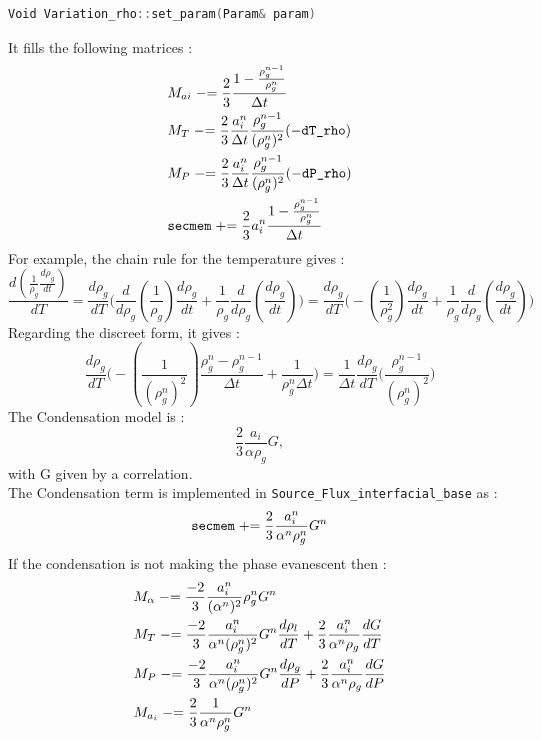 \begin{lstlisting}[language=c++]
Void Variation_rho::set_param(Param& param)
\end{lstlisting}
It fills the following matrices :
\begin{align}
    &M_{ai} \mathrel{-}=  \frac{2}{3}\frac{1-\frac{\rho_g^{n-1}}{\rho_g^n}}{\Delta t}\\
    &M_{T} \mathrel{-}=  \frac{2}{3} \frac{a^n_i}{\Delta t} \frac{\rho_g^{n-1}}{(\rho_g^{n})^2}(-\texttt{dT\_rho})\\
    &M_{P} \mathrel{-}=  \frac{2}{3}\frac{a^n_i}{\Delta t} \frac{\rho_g^{n-1}}{(\rho_g^{n})^2}(-\texttt{dP\_rho})\\
    &\texttt{secmem} \mathrel{+}=  \frac{2}{3}a^n_i\frac{1-\frac{\rho_g^{n-1}}{\rho_g^n}}{\Delta t}
\end{align}
For example, the chain rule for the temperature gives :
\begin{equation}
    \frac{d(\frac{1}{\rho_g}\frac{d\rho_g}{dt})}{dT}=\frac{d\rho_g}{dT}\Bigg(\frac{d}{d\rho_g}(\frac{1}{\rho_g})\frac{d\rho_g}{dt}+\frac{1}{\rho_g}\frac{d}{d\rho_g}(\frac{d\rho_g}{dt}) \Bigg)=\frac{d\rho_g}{dT}\Bigg(-(\frac{1}{\rho_g^2})\frac{d\rho_g}{dt}+\frac{1}{\rho_g}\frac{d}{d\rho_g}(\frac{d\rho_g}{dt}) \Bigg)
\end{equation}
Regarding the discreet form, it gives :
\begin{equation}
   \frac{d\rho_g}{dT}\Bigg(-(\frac{1}{(\rho_g^n)^2})\frac{\rho_g^n-\rho_g^{n-1}}{\Delta t}+\frac{1}{\rho_g^n\Delta t}\Bigg)=\frac{1}{\Delta t}\frac{d\rho_g}{dT}\Bigg(\frac{\rho_g^{n-1}}{(\rho_g^n)^2}\Bigg)
\end{equation}
The {\colorbox{codebackground}{\color{codekeyword3} Condensation}} model is :
\begin{equation}
    \frac{2}{3}\frac{a_i}{\alpha \rho_g} G,
\end{equation}
with G given by a correlation.\\
The {\colorbox{codebackground}{\color{codekeyword3} Condensation}} term is implemented in \texttt{Source_Flux_interfacial_base} as :
\begin{equation}
    \texttt{secmem}  \mathrel{+}=  \frac{2}{3}\frac{a_i^n}{\alpha^n\rho_g^n} G^n
\end{equation}
If the condensation is not making the phase evanescent then : 
\begin{align}
    &M_\alpha  \mathrel{-}=  \frac{-2}{3}\frac{a_i^n}{(\alpha^n)^2}\rho_g^n G^n\\
    &M_T  \mathrel{-}=  \frac{-2}{3}\frac{a_i^n}{\alpha^n(\rho_g^n)^2} G^n \frac{d\rho_l}{dT}+\frac{2}{3}\frac{a_i^n}{\alpha^n\rho_g} \frac{dG}{dT}\\
    &M_P  \mathrel{-}=  \frac{-2}{3}\frac{a_i^n}{\alpha^n(\rho_g^n)^2} G^n \frac{d\rho_g}{dP}+\frac{2}{3}\frac{a_i^n}{\alpha^n\rho_g} \frac{dG}{dP}\\
    &M_{a_i}  \mathrel{-}=  \frac{2}{3}\frac{1}{\alpha^n\rho_g^n} G^n
\end{align}

